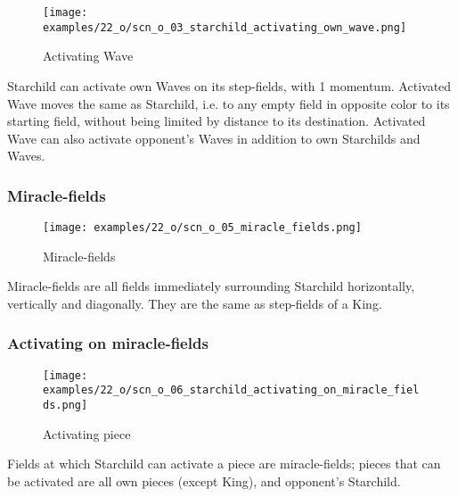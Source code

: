 \noindent
\begin{wrapfigure}[10]{l}{0.4\textwidth}
\centering
\texttt{[image: examples/22\_o/scn\_o\_03\_starchild\_activating\_own\_wave.png]}
\caption{Activating Wave}
\label{fig:scn_o_03_starchild_activating_own_wave}
\end{wrapfigure}
Starchild can activate own Waves on its step-fields, with 1 momentum. Activated Wave
moves the same as Starchild, i.e. to any empty field in opposite color to its starting
field, without being limited by distance to its destination. \newline
\indent
Activated Wave can also activate opponent's Waves in addition to own Starchilds and
Waves.

\clearpage %

\subsubsection*{Miracle-fields}
\label{sec:One/Starchild/Movement/Miracle-fields}

\noindent
\begin{wrapfigure}[5]{l}{0.4\textwidth}
\centering
\texttt{[image: examples/22\_o/scn\_o\_05\_miracle\_fields.png]}
\caption{Miracle-fields}
\label{fig:scn_o_05_miracle_fields}
\end{wrapfigure}
Miracle-fields are all fields immediately surrounding Starchild horizontally,
vertically and diagonally. They are the same as step-fields of a King.

\vspace*{2.1\baselineskip}
\subsubsection*{Activating on miracle-fields}
\label{sec:One/Starchild/Movement/Activating on miracle-fields}

\noindent
\begin{wrapfigure}[8]{l}{0.4\textwidth}
\centering
\texttt{[image: examples/22\_o/scn\_o\_06\_starchild\_activating\_on\_miracle\_fields.png]}
\caption{Activating piece}
\label{fig:scn_o_06_starchild_activating_on_miracle_fields}
\end{wrapfigure}
Fields at which Starchild can activate a piece are miracle-fields; pieces that
can be activated are all own pieces (except King), and opponent's Starchild.

